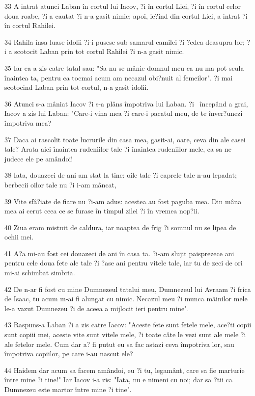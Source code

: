 \par 33 A intrat atunci Laban în cortul lui Iacov, ?i în cortul Liei, ?i în cortul celor doua roabe, ?i a cautat ?i n-a gasit nimic; apoi, ie?ind din cortul Liei, a intrat ?i în cortul Rahilei.
\par 34 Rahila însa luase idolii ?i-i pusese sub samarul camilei ?i ?edea deasupra lor; ?i a scotocit Laban prin tot cortul Rahilei ?i n-a gasit nimic.
\par 35 Iar ea a zis catre tatal sau: "Sa nu se mânie domnul meu ca nu ma pot scula înaintea ta, pentru ca tocmai acum am necazul obi?nuit al femeilor". ?i mai scotocind Laban prin tot cortul, n-a gasit idolii.
\par 36 Atunci s-a mâniat Iacov ?i s-a plâns împotriva lui Laban. ?i  începând a grai, Iacov a zis lui Laban: "Care-i vina mea ?i care-i pacatul meu, de te înver?unezi împotriva mea?
\par 37 Daca ai rascolit toate lucrurile din casa mea, gasit-ai, oare, ceva din ale casei tale? Arata aici înaintea rudeniilor tale ?i înaintea rudeniilor mele, ca sa ne judece ele pe amândoi!
\par 38 Iata, douazeci de ani am stat la tine: oile tale ?i caprele tale n-au lepadat; berbecii oilor tale nu ?i i-am mâncat,
\par 39 Vite sfâ?iate de fiare nu ?i-am adus: acestea au fost paguba mea. Din mâna mea ai cerut ceea ce se furase în timpul zilei ?i în vremea nop?ii.
\par 40 Ziua eram mistuit de caldura, iar noaptea de frig ?i somnul nu se lipea de ochii mei.
\par 41 A?a mi-au fost cei douazeci de ani în casa ta. ?i-am slujit paisprezece ani pentru cele doua fete ale tale ?i ?ase ani pentru vitele tale, iar tu de zeci de ori mi-ai schimbat simbria.
\par 42 De n-ar fi fost cu mine Dumnezeul tatalui meu, Dumnezeul lui Avraam ?i frica de Isaac, tu acum m-ai fi alungat cu nimic. Necazul meu ?i munca mâinilor mele le-a vazut Dumnezeu ?i de aceea a mijlocit ieri pentru mine".
\par 43 Raspuns-a Laban ?i a zis catre Iacov: "Aceste fete sunt fetele mele, ace?ti copii sunt copiii mei, aceste vite sunt vitele mele, ?i toate câte le vezi sunt ale mele ?i ale fetelor mele. Cum dar a? fi putut eu sa fac astazi ceva împotriva lor, sau împotriva copiilor, pe care i-au nascut ele?
\par 44 Haidem dar acum sa facem amândoi, eu ?i tu, legamânt, care sa fie marturie între mine ?i tine!" Iar Iacov i-a zis: "Iata, nu e nimeni cu noi; dar sa ?tii ca Dumnezeu este martor între mine ?i tine".
